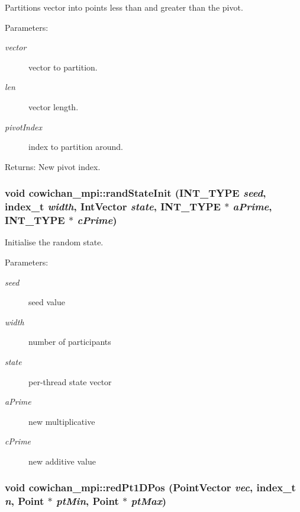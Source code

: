 Partitions vector into points less than and greater than the pivot. \begin{Desc}
\item[Parameters:]
\begin{description}
\item[{\em vector}]vector to partition. \item[{\em len}]vector length. \item[{\em pivotIndex}]index to partition around. \end{description}
\end{Desc}
\begin{Desc}
\item[Returns:]New pivot index. \end{Desc}
\hypertarget{namespacecowichan__mpi_9a2d3b047e280fd12498b0ccd86c4677}{
\subsubsection[{randStateInit}]{\setlength{\rightskip}{0pt plus 5cm}void cowichan\_\-mpi::randStateInit ({\bf INT\_\-TYPE} {\em seed}, \/  {\bf index\_\-t} {\em width}, \/  {\bf IntVector} {\em state}, \/  {\bf INT\_\-TYPE} $\ast$ {\em aPrime}, \/  {\bf INT\_\-TYPE} $\ast$ {\em cPrime})}}
\label{namespacecowichan__mpi_9a2d3b047e280fd12498b0ccd86c4677}


Initialise the random state. \begin{Desc}
\item[Parameters:]
\begin{description}
\item[{\em seed}]seed value \item[{\em width}]number of participants \item[{\em state}]per-thread state vector \item[{\em aPrime}]new multiplicative \item[{\em cPrime}]new additive value \end{description}
\end{Desc}
\hypertarget{namespacecowichan__mpi_4dabc70bacdff24786cbd9fff3227457}{
\subsubsection[{redPt1DPos}]{\setlength{\rightskip}{0pt plus 5cm}void cowichan\_\-mpi::redPt1DPos ({\bf PointVector} {\em vec}, \/  {\bf index\_\-t} {\em n}, \/  {\bf Point} $\ast$ {\em ptMin}, \/  {\bf Point} $\ast$ {\em ptMax})}}
\label{namespacecowichan__mpi_4dabc70bacdff24786cbd9fff3227457}


